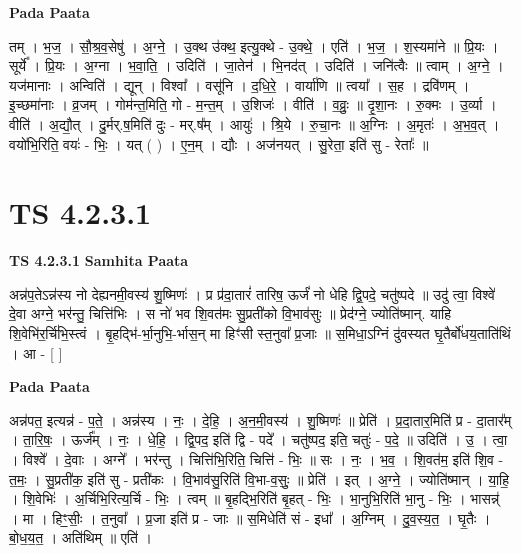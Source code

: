 \documentclass[17pt]{extarticle}
\begin{document}
\textbf{Pada Paata} \newline

तम् । भ॒ज॒ । सौ॒श्र॒व॒सेषु॑ । अ॒ग्ने॒ । उ॒क्थ उ॑क्थ॒ इत्यु॒क्थे - उ॒क्थे॒ । एति॑ । भ॒ज॒ । श॒स्यमा॑ने ॥ प्रि॒यः । सूर्ये᳚ । प्रि॒यः । अ॒ग्ना । भ॒वा॒ति॒ । उदिति॑ । जा॒तेन॑ । भि॒नद॑त् । उदिति॑ । जनि॑त्वैः ॥ त्वाम् । अ॒ग्ने॒ । यज॑मानाः । अन्विति॑ । द्यून् । विश्वा᳚ । वसू॑नि । द॒धि॒रे॒ । वार्या॑णि ॥ त्वया᳚ । स॒ह । द्रवि॑णम् । इ॒च्छमा॑नाः । व्र॒जम् । गोम॑न्त॒मिति॒ गो - म॒न्त॒म् । उ॒शिजः॑ । वीति॑ । व॒व्रुः॒ ॥ दृ॒शा॒नः । रु॒क्मः । उ॒र्व्या । वीति॑ । अ॒द्यौ॒त् । दु॒र्मर्.ष॒मिति॑ दुः - मर्.ष᳚म् । आयुः॑ । श्रि॒ये । रु॒चा॒नः ॥ अ॒ग्निः । अ॒मृतः॑ । अ॒भ॒व॒त् । वयो॑भि॒रिति॒ वयः॑ - भिः॒ । यत् ( ) । ए॒न॒म् । द्यौः । अज॑नयत् । सु॒रेता॒ इति॑ सु - रेताः᳚ ॥  \newline




\section*{ TS 4.2.3.1 }

\textbf{TS 4.2.3.1 } \newline
\textbf{Samhita Paata} \newline

अन्न॑प॒तेऽन्न॑स्य नो देह्यनमी॒वस्य॑ शु॒ष्मिणः॑ । प्र प्र॑दा॒तारं॑ तारिष॒ ऊर्जं॑ नो धेहि द्वि॒पदे॒ चतु॑ष्पदे ॥ उदु॑ त्वा॒ विश्वे॑ दे॒वा अग्ने॒ भर॑न्तु॒ चित्ति॑भिः । स नो॑ भव शि॒वत॑मः सु॒प्रती॑को वि॒भाव॑सुः ॥ प्रेद॑ग्ने॒ ज्योति॑ष्मान्. याहि शि॒वेभि॑र॒र्चि॑भि॒स्त्वं । बृ॒हद्भि॑-र्भा॒नुभि॒-र्भास॒न् मा हिꣳ॑सी स्त॒नुवा᳚ प्र॒जाः ॥ स॒मिधा॒ऽग्निं दु॑वस्यत घृ॒तैर्बो॑धय॒ताति॑थिं । आ - [  ] \newline

\textbf{Pada Paata} \newline

अन्न॑पत॒ इत्यन्न॑ - प॒ते॒ । अन्न॑स्य । नः॒ । दे॒हि॒ । अ॒न॒मी॒वस्य॑ । शु॒ष्मिणः॑ ॥ प्रेति॑ । प्र॒दा॒तार॒मिति॑ प्र - दा॒तार᳚म् । ता॒रि॒षः॒ । ऊर्ज᳚म् । नः॒ । धे॒हि॒ । द्वि॒पद॒ इति॑ द्वि - पदे᳚ । चतु॑ष्पद॒ इति॒ चतुः॑ - प॒दे॒ ॥ उदिति॑ । उ॒ । त्वा॒ । विश्वे᳚ । दे॒वाः । अग्ने᳚ । भर॑न्तु । चित्ति॑भि॒रिति॒ चित्ति॑ - भिः॒ ॥ सः । नः॒ । भ॒व॒ । शि॒वत॑म॒ इति॑ शि॒व - त॒मः॒ । सु॒प्रती॑क॒ इति॑ सु - प्रती॑कः । वि॒भाव॑सु॒रिति॑ वि॒भा-व॒सुः॒ ॥ प्रेति॑ । इत् । अ॒ग्ने॒ । ज्योति॑ष्मान् । या॒हि॒ । शि॒वेभिः॑ । अ॒र्चिभि॒रित्य॒र्चि - भिः॒ । त्वम् ॥ बृ॒हद्भि॒रिति॑ बृ॒हत् - भिः॒ । भा॒नुभि॒रिति॑ भा॒नु - भिः॒ । भासन्न्॑ । मा । हिꣳ॒॒सीः॒ । त॒नुवा᳚ । प्र॒जा इति॑ प्र - जाः ॥ स॒मिधेति॑ सं - इधा᳚ । अ॒ग्निम् । दु॒व॒स्य॒त॒ । घृ॒तैः । बो॒ध॒य॒त॒ । अति॑थिम् ॥ एति॑ ।  \newline
\end{document}
